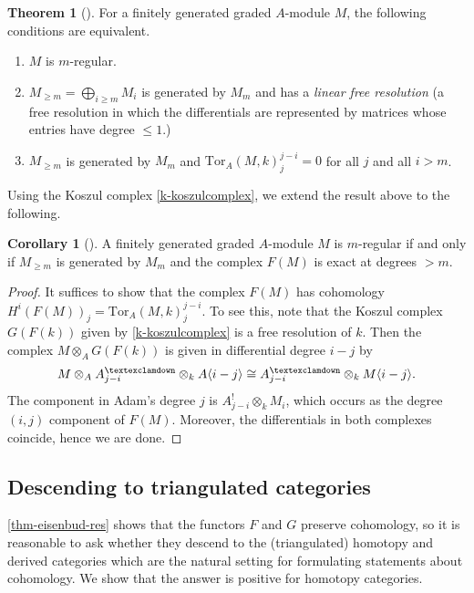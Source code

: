 \documentclass[a4paper]{article}
\theoremstyle{definition}
\newtheorem{theorem}[defn]{Theorem}
\newtheorem{cor}[defn]{Corollary}
\theoremstyle{remark}
\newcommand{\gnab}{{\textexclamdown}}
\begin{document}
\begin{theorem}[] For a finitely generated
    graded \(A\)-module \(M\), the following conditions are equivalent. 
    \begin{enumerate}
        \item \(M\) is \(m\)-regular.
        \item \(M_{\geq m} = \bigoplus_{i\geq m} M_i\) is generated by \(M_m\) and
            has a \textit{linear free resolution} (a free resolution in which
            the differentials are represented by matrices whose entries have
            degree \(\leq 1\).)
        \item \(M_{\geq m}\) is generated by \(M_m\) and
            \(\text{Tor}_A(M,k)^{j-i}_{j}=0\) for all \(j\) and all \(i>m\).
    \end{enumerate}
\end{theorem}

Using the Koszul complex \eqref{k-koszulcomplex}, we extend the result above to
the following. 

\begin{cor}[] \label{regularity-criterion} A
    finitely generated graded \(A\)-module \(M\) is \(m\)-regular if and only if
    \(M_{\geq m}\) is generated by \(M_m\) and the complex \(F(M)\) is exact at
    degrees \(>m\).
    \begin{proof}
        It suffices to show that the complex \(F(M)\) has cohomology \(H^i(F(M))_j=
        \text{Tor}_A(M,k)^{j-i}_{j}\). To see this, note that the Koszul complex
        \(G(F(k))\) given by \eqref{k-koszulcomplex} is a free resolution of
        \(k\). Then the complex \(M\otimes_A G(F(k))\) is given in differential
        degree \(i-j\) by 
        \[M\otimes_AA^\gnab_{j-i}\otimes_k A\langle i-j \rangle \cong
        A^\gnab_{j-i} \otimes_k M\langle i-j \rangle.\]
        The component in Adam's degree \(j\) is \(A^!_{j-i}\otimes_k M_i\),
        which occurs as the degree \((i,j)\) component of \(F(M)\). Moreover,
        the differentials in both complexes coincide, hence we are done.
    \end{proof}
\end{cor}

\subsection{Descending to triangulated categories}

\cref{thm-eisenbud-res} shows that the functors \(F\) and \(G\) preserve
cohomology, so it is reasonable to ask whether they descend to the
(triangulated) homotopy and derived categories which are the natural setting for
formulating statements about cohomology. We show that the answer is positive
for homotopy categories.
\end{document}

